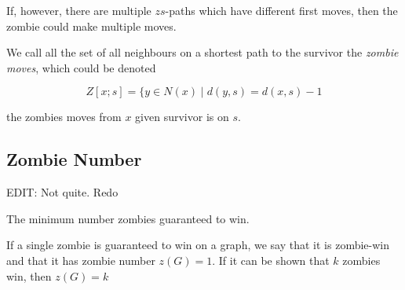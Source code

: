 If, however, there are multiple $zs$-paths which have different first moves,
then the zombie could make multiple moves.

We call all the set of all neighbours on
a shortest path to the survivor the \textit{zombie moves}, which could be denoted

\[ Z[x; s] = \{ y \in N(x) \mid d(y, s) = d(x, s) - 1 \]

the zombies moves from $x$ given survivor is on $s$.

\subsection{Zombie Number}

EDIT: Not quite. Redo

The minimum number zombies guaranteed to win.

If a single zombie is guaranteed to win on a graph, we say that it is zombie-win
and that it has zombie number $z(G) = 1$. If it can be shown that $k$ zombies win,
then $z(G) = k$
